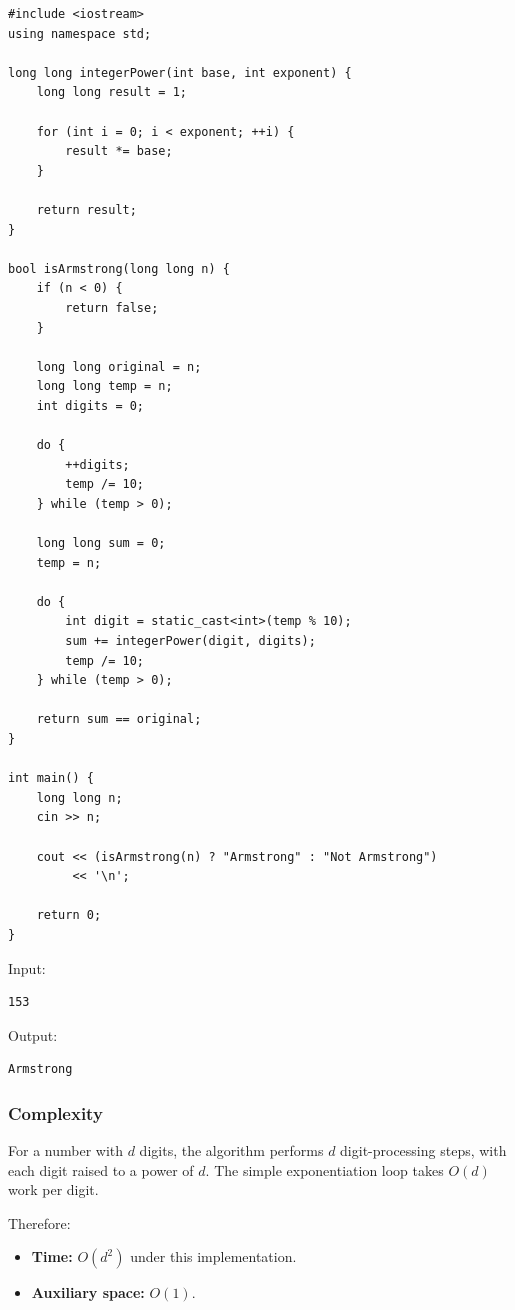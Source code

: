 \begin{lstlisting}[style=cppstyle]
#include <iostream>
using namespace std;

long long integerPower(int base, int exponent) {
    long long result = 1;

    for (int i = 0; i < exponent; ++i) {
        result *= base;
    }

    return result;
}

bool isArmstrong(long long n) {
    if (n < 0) {
        return false;
    }

    long long original = n;
    long long temp = n;
    int digits = 0;

    do {
        ++digits;
        temp /= 10;
    } while (temp > 0);

    long long sum = 0;
    temp = n;

    do {
        int digit = static_cast<int>(temp % 10);
        sum += integerPower(digit, digits);
        temp /= 10;
    } while (temp > 0);

    return sum == original;
}

int main() {
    long long n;
    cin >> n;

    cout << (isArmstrong(n) ? "Armstrong" : "Not Armstrong")
         << '\n';

    return 0;
}
\end{lstlisting}

Input:

\begin{lstlisting}[style=pseudocode]
153
\end{lstlisting}

Output:

\begin{lstlisting}[style=pseudocode]
Armstrong
\end{lstlisting}

\subsubsection{Complexity}

For a number with $d$ digits, the algorithm performs $d$ digit-processing steps, with each digit raised to a power of $d$. The simple exponentiation loop takes $O(d)$ work per digit.

Therefore:

\begin{itemize}
    \item \textbf{Time:} $O(d^2)$ under this implementation.
    \item \textbf{Auxiliary space:} $O(1)$.
\end{itemize}

